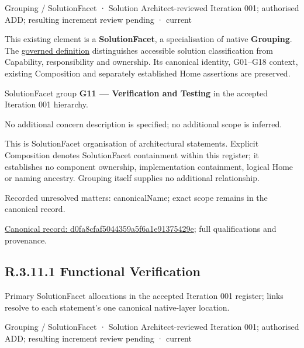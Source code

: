 \label{element:d0fa8cfaf5044359a5f6a1e91375429e}
{\small Grouping / SolutionFacet · Solution Architect-reviewed Iteration 001; authorised ADD; resulting increment review pending · current}\par

This existing element is a \textbf{SolutionFacet}, a specialisation of native
\textbf{Grouping}. The \href{\detokenize{../../../../../../../governance/continuum-representation.md#solutionfacet-classification--1119-candidate}}{governed definition}
distinguishes accessible solution classification from Capability, responsibility
and ownership. Its canonical identity, G01–G18 context, existing Composition
and separately established Home assertions are preserved.



SolutionFacet group \textbf{G11 — Verification and Testing} in the accepted Iteration 001 hierarchy.



No additional concern description is specified; no additional scope is inferred.



This is SolutionFacet organisation of architectural statements. Explicit Composition denotes SolutionFacet containment within this register; it establishes no component ownership, implementation containment, logical Home or naming ancestry. Grouping itself supplies no additional relationship.


{\small Recorded unresolved matters: canonicalName; exact scope remains in the canonical record.}\par
{\footnotesize \href{../../../../../../../continuum/grouping/d0fa8cfaf5044359a5f6a1e91375429e.md}{Canonical record: d0fa8cfaf5044359a5f6a1e91375429e}; full qualifications and provenance.}\par
\subsection*{R.3.11.1 Functional Verification}
\label{navigation:R.3.11.1}

Primary SolutionFacet allocations in the accepted Iteration 001 register; links resolve to each statement’s one canonical native-layer location.\par
\label{element:ab65501a8e3542839707ae31cd0b8efd}
{\small Grouping / SolutionFacet · Solution Architect-reviewed Iteration 001; authorised ADD; resulting increment review pending · current}\par


